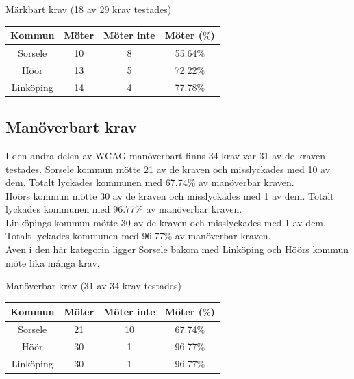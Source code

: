 \documentclass[11p]{article}
\begin{document}
    \begin{center}
    Märkbart krav (18 av 29 krav testades)

    \begin{tabular}{ |c|c|c|c|}
        \hline
        Kommun & Möter & Möter inte & Möter ($\%$) \\  \hline
        Sorsele & 10 & 8 & 55.64$\%$ \\ \hline
        Höör & 13 & 5 & 72.22$\%$ \\ \hline
        Linköping & 14 & 4 & 77.78$\%$ \\ \hline
    \end{tabular}
    \end{center}

    \subsection{Manöverbart krav}
    I den andra delen av WCAG manöverbart finns 34 krav var 31 av de kraven testades.
    Sorsele kommun mötte 21 av de kraven och misslyckades med 10 av dem.
    Totalt lyckades kommunen med 67.74$\%$ av manöverbar kraven.
    \\Höörs kommun mötte 30 av de kraven och misslyckades med 1 av dem.
    Totalt lyckades kommunen med 96.77$\%$ av manöverbar kraven.
    \\Linköpings kommun mötte 30 av de kraven och misslyckades med 1 av dem.
    Totalt lyckades kommunen med 96.77$\%$ av manöverbar kraven.
    \\Även i den här kategorin ligger Sorsele bakom med Linköping och Höörs kommun möte lika många krav.

    \begin{center}
    Manöverbar krav (31 av 34 krav testades)

    \begin{tabular}{ |c|c|c|c|}
        \hline
        Kommun & Möter & Möter inte & Möter ($\%$) \\  \hline
        Sorsele & 21 & 10 & 67.74$\%$ \\ \hline
        Höör & 30 & 1 & 96.77$\%$ \\ \hline
        Linköping & 30 & 1 & 96.77$\%$ \\ \hline
    \end{tabular}
    \end{center}
\end{document}
